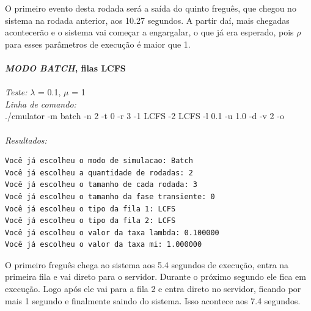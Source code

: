 \documentclass[a4paper,10pt]{article}
\begin{document}
    O primeiro evento desta rodada será a saída do quinto freguês, que chegou no sistema na rodada anterior, aos 10.27 segundos. A partir daí, mais chegadas acontecerão e o sistema vai começar a engargalar, o que já era esperado, pois $\rho$ para esses parâmetros de execução é maior que 1.
\\
\\
\textbf{\emph{MODO BATCH}, filas LCFS}
\\
\\
\emph{Teste:} $\lambda$ = 0.1, $\mu$ = 1
\\
\emph{Linha de comando:}
\\
./cmulator -m batch -n 2 -t 0 -r 3 -1 LCFS -2 LCFS -l 0.1 -u 1.0 -d -v 2 -o
\\
\\
\emph{Resultados:}
\\\begin{verbatim}
Você já escolheu o modo de simulacao: Batch
Você já escolheu a quantidade de rodadas: 2
Você já escolheu o tamanho de cada rodada: 3
Você já escolheu o tamanho da fase transiente: 0
Você já escolheu o tipo da fila 1: LCFS
Você já escolheu o tipo da fila 2: LCFS
Você já escolheu o valor da taxa lambda: 0.100000
Você já escolheu o valor da taxa mi: 1.000000
\end{verbatim}
    O primeiro freguês chega ao sistema aos 5.4 segundos de execução, entra na primeira fila e vai direto para o servidor. Durante o próximo segundo ele fica em execução. Logo após ele vai para a fila 2 e entra direto no servidor, ficando por mais 1 segundo e finalmente saindo do sistema. Isso acontece aos 7.4 segundos.
\end{document}
